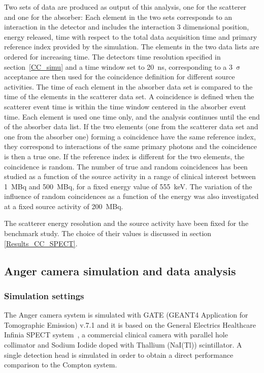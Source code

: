 Two sets of data are produced as output of this analysis, one for the scatterer and one for the absorber: Each element in the two sets corresponds to an interaction in the detector and includes the interaction 3 dimensional position, energy released, time with respect to the total data acquisition time and primary reference index provided by the simulation. The elements in the two data lists are ordered for increasing time. The detectors time resolution specified in section~\ref{CC_simu} and a time window set to 20~ns, corresponding to a 3~$\mathrm{\sigma}$ acceptance are then used for the coincidence definition for different source activities. The time of each element in the absorber data set is compared to the time of the elements  in the scatterer data set. A coincidence is defined when the scatterer event time is within the time window centered in the absorber event time. Each element is used one time only, and the analysis continues until the end of the absorber data list. If the two  elements (one from the scatterer data set and one from the absorber one) forming a coincidence have the same reference index, they correspond to interactions of the same primary photons and the coincidence is then a true one. If the reference index is different for the two elements, the coincidence is random. The number of true and random coincidences has been studied as a function of the source activity in a range of clinical interest between 1~MBq and 500~MBq, for a fixed energy value of 555~keV. The variation of the influence of random coincidences as a function of the energy was also investigated at a fixed source activity of 200~MBq.

The scatterer energy resolution and the source activity have been fixed for the benchmark study. The choice of their values is discussed in section \ref{Results_CC_SPECT}. 

\subsection{Anger camera simulation and data analysis}\label{Anger_descr}

\subsubsection{Simulation settings}\label{AC_settings}
The Anger camera system is simulated with GATE (GEANT4 Application for Tomographic Emission) v.7.1 and it is based on the General Electrics Healthcare Infinia SPECT system~\cite{AC_datasheet}, a commercial clinical camera with parallel hole collimator and Sodium Iodide doped with Thallium (NaI(Tl)) scintillator. A single detection head is simulated in order to obtain a direct performance comparison to the Compton system.

